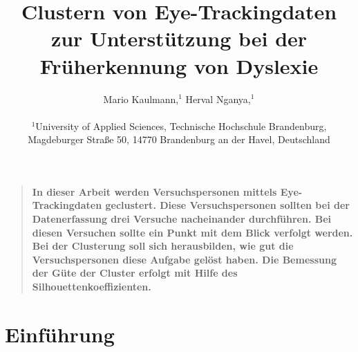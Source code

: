 \documentclass[12pt]{article}
\title{Clustern von Eye-Trackingdaten zur Unterstützung bei der Früherkennung von Dyslexie}
\author
{Mario Kaulmann,$^{1}$ Herval Nganya,$^{1}$\\
\\
\normalsize{$^{1}$University of Applied Sciences, Technische Hochschule Brandenburg,}\\
\normalsize{Magdeburger Stra\ss{}e 50, 14770 Brandenburg an der Havel, Deutschland}\\
}
\date{}
\newenvironment{sciabstract}{%
\begin{quote} \bf}
{\end{quote}}
\begin{document}
 


\baselineskip18pt


\maketitle 




\begin{sciabstract}
  In dieser Arbeit werden Versuchspersonen mittels Eye-Trackingdaten geclustert. Diese Versuchspersonen sollten bei der Datenerfassung drei Versuche nacheinander durchf\"uhren. Bei diesen Versuchen sollte ein Punkt mit dem Blick verfolgt werden. Bei der Clusterung soll sich herausbilden, wie gut die Versuchspersonen diese Aufgabe gel\"ost haben. Die Bemessung der G\"ute der Cluster erfolgt mit Hilfe des Silhouettenkoeffizienten.
\end{sciabstract}




\section*{Einf\"uhrung}
\end{document}
